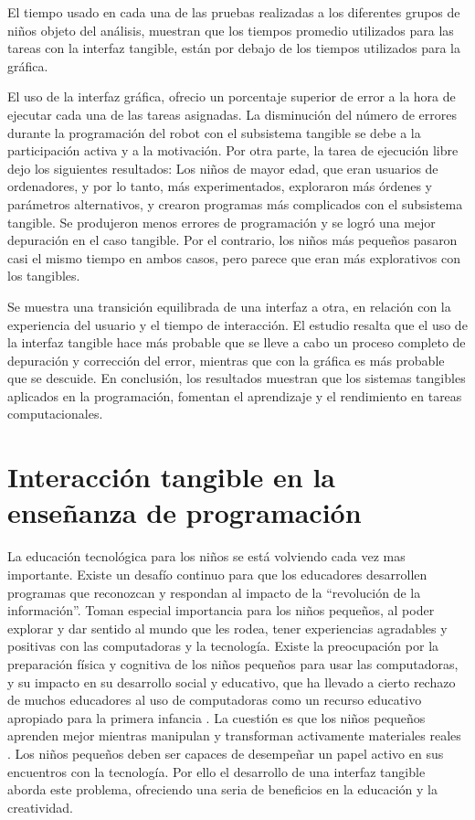 El tiempo usado en cada una de las pruebas realizadas a los diferentes grupos de niños objeto del análisis, muestran que los tiempos promedio utilizados para las tareas con la interfaz tangible, están por debajo de los tiempos utilizados para la gráfica.

El uso de la interfaz gráfica, ofrecio un porcentaje superior de error a la hora de ejecutar cada una de las tareas asignadas. La disminución del número de errores durante la programación del robot con el subsistema tangible se debe a la participación activa y a la motivación.
Por otra parte, la tarea de ejecución libre dejo los siguientes resultados:
Los niños de mayor edad, que eran usuarios de ordenadores, y por lo tanto, más experimentados, exploraron más órdenes y parámetros alternativos, y crearon programas más complicados con el subsistema tangible. Se produjeron menos errores de programación y se logró una mejor depuración en el caso tangible.
Por el contrario, los niños más pequeños pasaron casi el mismo tiempo en ambos casos, pero parece que eran más explorativos con los tangibles.

Se muestra una transición equilibrada de una interfaz a otra, en relación con la experiencia del usuario y el tiempo de interacción.
El estudio resalta que el uso de la interfaz tangible hace más probable que se lleve a cabo un proceso completo de depuración y corrección del error, mientras que con la gráfica es más probable que se descuide.
En conclusión, los resultados muestran que los sistemas tangibles aplicados en la programación, fomentan el aprendizaje y el rendimiento en tareas computacionales.


\section{Interacción tangible en la enseñanza de programación}

La educación tecnológica para los niños se está volviendo cada vez mas importante. Existe un desafío continuo para que los educadores desarrollen programas que reconozcan y respondan al impacto de la “revolución de la información”. Toman especial importancia para los niños pequeños, al poder explorar y dar sentido al mundo que les rodea, tener experiencias agradables y positivas con las computadoras y la tecnología. Existe la preocupación por la preparación física y cognitiva de los niños pequeños para usar las computadoras, y su impacto en su desarrollo social y educativo, que ha llevado a cierto rechazo de muchos educadores al uso de computadoras como un recurso educativo apropiado para la primera infancia \cite{Bailey}.
La cuestión es que los niños pequeños aprenden mejor mientras manipulan y transforman activamente materiales reales \cite{Beaty}.
Los niños pequeños deben ser capaces de desempeñar un papel activo en sus encuentros con la tecnología. Por ello el desarrollo de una interfaz tangible aborda este problema, ofreciendo una seria de beneficios en la educación y la creatividad. 

